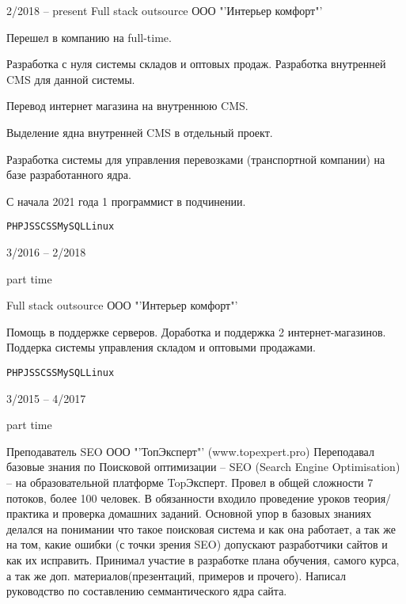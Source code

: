 \documentclass[10pt]{tpl/developercv} %
\begin{document}



\begin{entrylist}
	\entry
		{2/2018 -- present}
		{Full stack outsource}
		{ООО "'Интерьер комфорт"' }
		{
    Перешел в компанию на full-time.

    Разработка с нуля системы складов и оптовых продаж. Разработка внутренней CMS для данной системы.

		Перевод интернет магазина на внутреннюю CMS.

		Выделение ядна внутренней CMS в отдельный проект.

		Разработка системы для управления перевозками (транспортной компании) на базе разработанного ядра.

		С начала 2021 года 1 программист в подчинении.

		\texttt{PHP}\slashsep\texttt{JS}\slashsep\texttt{SCSS}\slashsep\texttt{MySQL}\slashsep\texttt{Linux}}
    
	\entry
		{3/2016 -- 2/2018

		\footnotesize{part time}}
		{Full stack outsource}
		{ООО "'Интерьер комфорт"' }
		{Помощь в поддержке серверов. Доработка и поддержка 2 интернет-магазинов. Поддерка системы управления складом и оптовыми продажами.

		\texttt{PHP}\slashsep\texttt{JS}\slashsep\texttt{SCSS}\slashsep\texttt{MySQL}\slashsep\texttt{Linux}}

	\entry
		{3/2015 -- 4/2017

		\footnotesize{part time}}
		{Преподаватель SEO}
		{ООО "'ТопЭксперт"' (www.topexpert.pro)}
		{Переподавал базовые знания по Поисковой оптимизации -- SEO (Search Engine Optimisation) -- на образовательной платформе TopЭксперт. Провел в общей сложности 7 потоков, более 100 человек. В обязанности входило проведение уроков теория/практика и проверка домашних заданий. Основной упор в базовых знаниях делался на понимании что такое поисковая система и как она работает, а так же на том, какие ошибки (с точки зрения SEO) допускают разработчики сайтов и как их исправить. Принимал участие в разработке плана обучения, самого курса, а так же доп. материалов(презентаций, примеров и прочего). Написал руководство по составлению семмантического ядра сайта.}


\end{entrylist}
\end{document}
